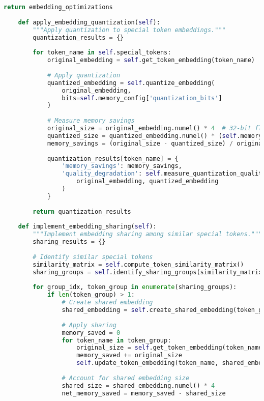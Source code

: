 \begin{lstlisting}[language=Python, caption=Comprehensive computational efficiency optimization framework]
        return embedding_optimizations
    
    def apply_embedding_quantization(self):
        """Apply quantization to special token embeddings."""
        quantization_results = {}
        
        for token_name in self.special_tokens:
            original_embedding = self.get_token_embedding(token_name)
            
            # Apply quantization
            quantized_embedding = self.quantize_embedding(
                original_embedding, 
                bits=self.memory_config['quantization_bits']
            )
            
            # Measure memory savings
            original_size = original_embedding.numel() * 4  # 32-bit floats
            quantized_size = quantized_embedding.numel() * (self.memory_config['quantization_bits'] / 8)
            memory_savings = (original_size - quantized_size) / original_size
            
            quantization_results[token_name] = {
                'memory_savings': memory_savings,
                'quality_degradation': self.measure_quantization_quality_loss(
                    original_embedding, quantized_embedding
                )
            }
        
        return quantization_results
    
    def implement_embedding_sharing(self):
        """Implement embedding sharing among similar special tokens."""
        sharing_results = {}
        
        # Identify similar special tokens
        similarity_matrix = self.compute_token_similarity_matrix()
        sharing_groups = self.identify_sharing_groups(similarity_matrix)
        
        for group_idx, token_group in enumerate(sharing_groups):
            if len(token_group) > 1:
                # Create shared embedding
                shared_embedding = self.create_shared_embedding(token_group)
                
                # Apply sharing
                memory_saved = 0
                for token_name in token_group:
                    original_size = self.get_token_embedding(token_name).numel() * 4
                    memory_saved += original_size
                    self.update_token_embedding(token_name, shared_embedding)
                
                # Account for shared embedding size
                shared_size = shared_embedding.numel() * 4
                net_memory_saved = memory_saved - shared_size
                

\end{lstlisting}
